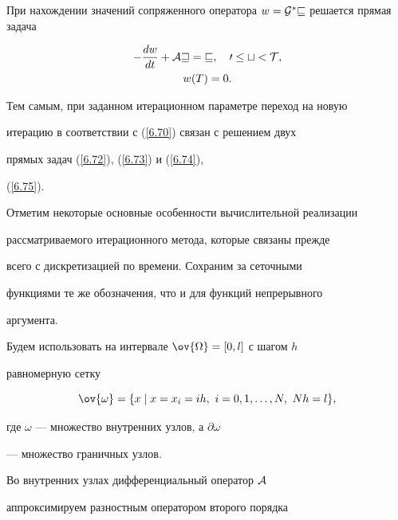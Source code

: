 При нахождении значений сопряженного оператора $w = \cal{G}^*


v$ решается прямая задача


\begin{gather}\label{6.74}


- \frac{d w}{d t} + \cal{A} w = v ,


\quad 0 \le t <  T, \\


%


\label{6.75}


 w(T) = 0 .


\end{gather}


Тем самым, при заданном итерационном параметре переход на новую


итерацию в соответствии с (\ref{6.70}) связан с решением двух


прямых задач (\ref{6.72}), (\ref{6.73}) и (\ref{6.74}),


(\ref{6.75}).





Отметим некоторые основные особенности вычислительной реализации


рассматриваемого итерационного метода, которые связаны прежде


всего с дискретизацией по времени. Сохраним за сеточными


функциями те же обозначения, что и для функций непрерывного


аргумента.


Будем использовать на интервале $\ov{\Omega} = [0,l]$ с шагом $h$


равномерную сетку 


$$


\ov{\omega} = \{x\mid x = x_i  = ih,


\ i = 0,1,\dotsc,N,\ Nh = l\},


$$


где $\omega$ --- множество внутренних узлов, а $\partial\omega$


--- множество граничных узлов.





Во внутренних узлах дифференциальный оператор $\cal{A}$


аппроксимируем разностным оператором второго порядка \cite{b12}


$$




